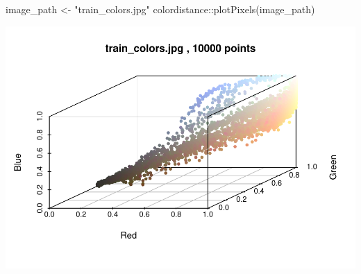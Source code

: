 \documentclass[
]{article}
\newenvironment{Shaded}{\begin{snugshade}}{\end{snugshade}}
\newcommand{\FunctionTok}[1]{\textcolor[rgb]{0.00,0.00,0.00}{#1}}
\newcommand{\NormalTok}[1]{#1}
\newcommand{\OtherTok}[1]{\textcolor[rgb]{0.56,0.35,0.01}{#1}}
\newcommand{\SpecialCharTok}[1]{\textcolor[rgb]{0.00,0.00,0.00}{#1}}
\newcommand{\StringTok}[1]{\textcolor[rgb]{0.31,0.60,0.02}{#1}}
\begin{document}
\begin{Shaded}
\begin{Highlighting}[]
\NormalTok{image\_path }\OtherTok{\textless{}{-}} \StringTok{"train\_colors.jpg"}
\NormalTok{colordistance}\SpecialCharTok{::}\FunctionTok{plotPixels}\NormalTok{(image\_path)}
\end{Highlighting}
\end{Shaded}

\begin{center}\includegraphics{ProjectPart1_MERGED_files/figure-latex/unnamed-chunk-2-1} \end{center}
\end{document}
